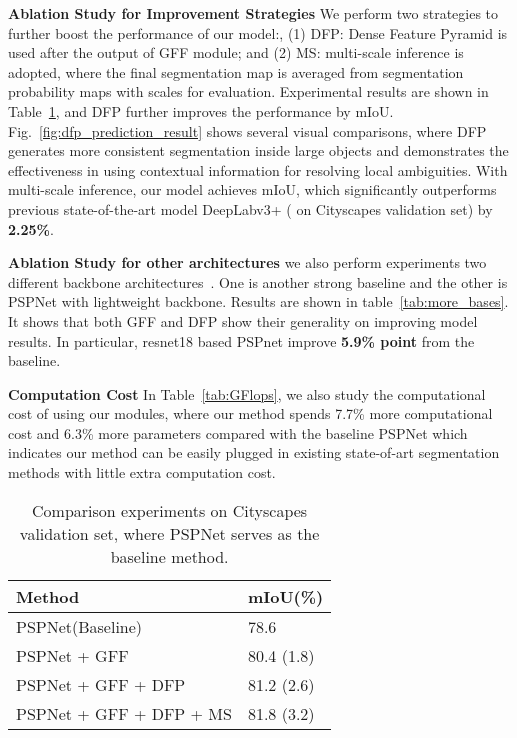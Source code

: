 \documentclass[letterpaper]{article} \usepackage{aaai20}  \usepackage{times}  \usepackage{helvet} \usepackage{courier}  \usepackage[hyphens]{url}  \usepackage{graphicx} \urlstyle{rm} \def\UrlFont{\rm}  \usepackage{graphicx}  \usepackage{amsmath}
\begin{document}
\noindent
\textbf{Ablation Study for Improvement Strategies} We perform two strategies to further boost the performance of our model:, (1) DFP: Dense Feature Pyramid is used after the output of GFF module; and (2) MS: multi-scale inference is adopted, where the final segmentation map is averaged from segmentation probability maps with scales  for evaluation. Experimental results are shown in Table~\ref{tab:improve}, and DFP further improves the performance by  mIoU. Fig.~\ref{fig:dfp_prediction_result} shows several visual comparisons, where DFP generates more consistent segmentation inside large objects and demonstrates the effectiveness in using contextual information for resolving local ambiguities. With multi-scale inference, our model achieves  mIoU, which significantly outperforms previous state-of-the-art model DeepLabv3+ ( on Cityscapes validation set) by \textbf{2.25\%}. 



\noindent
\textbf{Ablation Study for other architectures} we also perform experiments two different backbone architectures~\cite{denseaspp}. One is another strong baseline and the other is PSPNet with lightweight backbone. Results are shown in table~\ref{tab:more_bases}. It shows that both GFF and DFP show their generality on improving model results. In particular, resnet18 based PSPnet improve \textbf{5.9\% point} from the baseline.


\noindent
\textbf{Computation Cost} In Table~\ref{tab:GFlops}, we also study the computational cost of using our modules, where our method spends 7.7\% more computational cost and 6.3\% more parameters compared with the baseline PSPNet which indicates our method can be easily plugged in existing state-of-art segmentation methods with little extra computation cost.


\begin{table}[!t]
    \centering
    \footnotesize
    \begin{tabular}{l|l}
    \hline
    Method & mIoU(\%) \\
    \hline
    PSPNet(Baseline) & 78.6 \\
    \hline
    PSPNet + GFF & 80.4 (1.8) \\
    \hline
    \hline
    PSPNet + GFF + DFP & 81.2 (2.6) \\
    \hline
    PSPNet + GFF + DFP + MS & 81.8 (3.2) \\ 
    \hline
    \end{tabular}
     \caption{Comparison experiments on Cityscapes validation set, where PSPNet serves as the baseline method.}
     \label{tab:improve}
\end{table}
\end{document}
